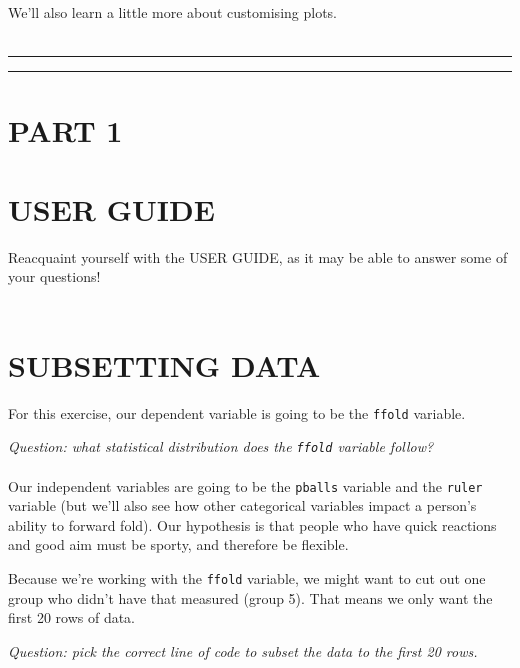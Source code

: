 \documentclass[
]{book}
\begin{document}
We'll also learn a little more about customising plots.\\
~\\

\begin{center}\rule{0.5\linewidth}{0.5pt}\end{center}

\begin{center}\rule{0.5\linewidth}{0.5pt}\end{center}

\hypertarget{part-1}{%
\section{PART 1}\label{part-1}}

\hypertarget{user-guide}{%
\section{USER GUIDE}\label{user-guide}}

Reacquaint yourself with the USER GUIDE, as it may be able to answer some of
your questions!\\
~\\

\hypertarget{subsetting-data}{%
\section{SUBSETTING DATA}\label{subsetting-data}}

For this exercise, our dependent variable is going to be the \texttt{ffold} variable.

\emph{Question: what statistical distribution does the \texttt{ffold} variable follow?}\\
~\\

Our independent variables are going to be the \texttt{pballs} variable and the
\texttt{ruler} variable (but we'll also see how other categorical variables impact
a person's ability to forward fold). Our hypothesis is that people who have
quick reactions and good aim must be sporty, and therefore be flexible.

Because we're working with the \texttt{ffold} variable, we might want to cut out
one group who didn't have that measured (group 5). That means we only want the first
20 rows of data.

\emph{Question: pick the correct line of code to subset the data to the first 20 rows.}
\end{document}
